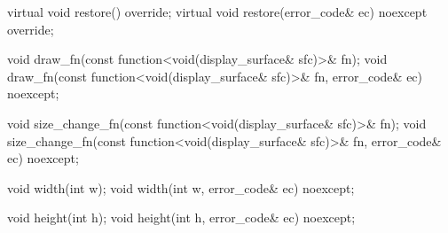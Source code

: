 \begin{itemdecl}
    virtual void restore() override;
    virtual void restore(error_code& ec) noexcept override;
\end{itemdecl}
\begin{itemdescr}
	\pnum
	\effects
	
	\pnum
	\postconditions
	
\end{itemdescr}

\begin{itemdecl}
    void draw_fn(const function<void(display_surface& sfc)>& fn);
    void draw_fn(const function<void(display_surface& sfc)>& fn,
      error_code& ec) noexcept;
\end{itemdecl}
\begin{itemdescr}
	\pnum
	\effects
	
	\pnum
	\postconditions
	
\end{itemdescr}

\begin{itemdecl}
    void size_change_fn(const function<void(display_surface& sfc)>& fn);
    void size_change_fn(const function<void(display_surface& sfc)>& fn,
      error_code& ec) noexcept;
\end{itemdecl}
\begin{itemdescr}
	\pnum
	\effects
	
	\pnum
	\postconditions
	
\end{itemdescr}

\begin{itemdecl}
    void width(int w);
    void width(int w, error_code& ec) noexcept;
\end{itemdecl}
\begin{itemdescr}
	\pnum
	\effects
	
	\pnum
	\postconditions
	
\end{itemdescr}

\begin{itemdecl}
    void height(int h);
    void height(int h, error_code& ec) noexcept;
\end{itemdecl}
\begin{itemdescr}
	\pnum
	\effects
	
	\pnum
	\postconditions
	
\end{itemdescr}


